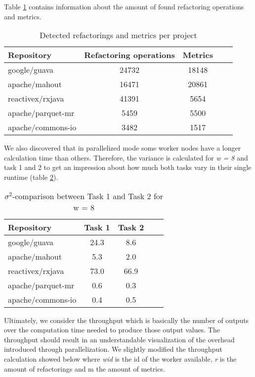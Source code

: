 Table \ref{tab:detectedrefandmetrics} contains information about the amount of found refactoring operations and metrics. 

\begin{table}[ht]
\caption{Detected refactorings and metrics per project}
\label{tab:detectedrefandmetrics}
\begin{center}
\begin{tabular}{|l|c|c|c|c|}
\hline
\textbf{Repository}&\textbf{Refactoring operations}&\textbf{Metrics}\\
\hline
google/guava& 24732 & 18148\\
\hline
apache/mahout& 16471 & 20861\\
\hline
reactivex/rxjava& 41391 & 5654\\
\hline
apache/parquet-mr & 5459 & 5500\\
\hline
apache/commons-io & 3482 & 1517\\
\hline
\end{tabular}
\end{center}
\end{table}

We also discovered that in parallelized mode some worker nodes have a longer calculation time than others. Therefore, the variance is calculated for \emph{w = 8} and task 1 and 2 to get an impression about how much both tasks vary in their single runtime (table \ref{tab:variance}).

\begin{table}[ht]
\caption{$\sigma^2$-comparison between Task 1 and Task 2 for w = 8}
\label{tab:variance}
\begin{center}
\begin{tabular}{|l|c|c|c|c|}
\hline
\textbf{Repository}&  \textbf{Task 1}&\textbf{Task 2}\\
\hline
google/guava& 24.3 & 8.6\\
\hline
apache/mahout& 5.3 & 2.0\\
\hline
reactivex/rxjava& 73.0 & 66.9\\
\hline
apache/parquet-mr& 0.6 & 0.3\\
\hline
apache/commons-io& 0.4 & 0.5\\
\hline
\end{tabular}
\end{center}
\end{table}

Ultimately, we consider the throughput which is basically the number of outputs over the computation time needed to produce those output values. The throughput should result in an understandable visualization of the overhead introduced through parallelization. We slightly modified the throughput calculation showed below where \emph{wid} is the id of the worker available, \emph{r} is the amount of refactorings and m the amount of metrics.

